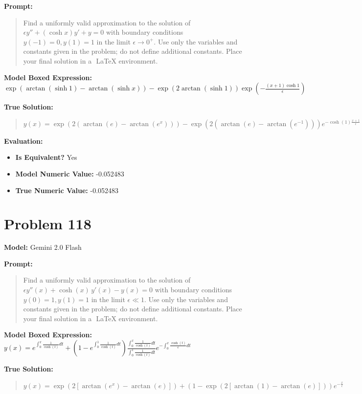 \documentclass{article}
\begin{document}
{\textbf{Prompt:}
\begin{quote}
Find a uniformly valid approximation to the solution of $\epsilon y'' + (\cosh x)y' + y = 0$ with boundary conditions $y(-1) = 0, y(1) = 1$ in the limit $\epsilon \to 0^+$. Use only the variables and constants given in the problem; do not define additional constants. Place your final solution in a $\boxed{}$ LaTeX environment.
\end{quote}
\textbf{Model Boxed Expression:} $\exp(\arctan(\sinh 1) - \arctan(\sinh x)) - \exp(2\arctan(\sinh 1))\exp\left(-\frac{(x+1)\cosh 1}{\epsilon}\right)$

\textbf{True Solution:}
\begin{quote}
$y(x) = \exp (2(\arctan(e)-\arctan(e^{x})))-\exp(2(\arctan(e)-\arctan(e^{-1})))e^{-\cosh(1)\frac{x+1}{\epsilon}}$
\end{quote}

\textbf{Evaluation:}
\begin{itemize}
\item \textbf{Is Equivalent?} Yes
\item \textbf{Model Numeric Value:} -0.052483
\item \textbf{True Numeric Value:} -0.052483
\end{itemize}
\vspace{1cm}
\section*{Problem 118}
\textbf{Model:} Gemini 2.0 Flash

\textbf{Prompt:}
\begin{quote}
Find a uniformly valid approximation to the solution of $\epsilon y''(x) + \cosh(x)\,y'(x) - y(x) = 0$ with boundary conditions $y(0)=1, y(1)=1$ in the limit $\epsilon \ll 1$. Use only the variables and constants given in the problem; do not define additional constants. Place your final solution in a $\boxed{}$ LaTeX environment.
\end{quote}
\textbf{Model Boxed Expression:} $y(x) = e^{\int_0^x \frac{1}{\cosh(t)}dt} + (1 - e^{\int_0^1 \frac{1}{\cosh(t)}dt}) \frac{\int_0^x \frac{1}{\cosh(t)}dt}{\int_0^1 \frac{1}{\cosh(t)}dt}e^{-\int_0^x \frac{\cosh(t)}{\epsilon}dt}$

\textbf{True Solution:}
\begin{quote}
$y(x) = \exp (2[\arctan(e^x) - \arctan(e)]) + (1 - \exp (2[\arctan(1) - \arctan(e)]))e^{-\frac{x}{\epsilon}}$
\end{quote}

}
\end{document}

